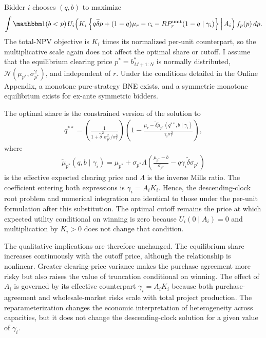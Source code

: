 \documentclass[10pt]{article}
\newcommand{\I}{\mathbbm1}
\theoremstyle{plain}
\theoremstyle{definition}
\begin{document}
Bidder $i$ chooses $(q,b)$ to maximize
\begin{align}
\label{eq:dcobjective-total}
\int
\I(b<p)\,
U_i\!\left(
K_i\left\{q\widetilde{\delta}p+(1-q)\mu_r-c_i
-RP_r^{\mathrm{unit}}(1-q\mid\gamma_i)\right\}
\,\middle|\,A_i
\right)f_p(p)\,dp.
\end{align}
The total-NPV objective is $K_i$ times its normalized per-unit counterpart, so
the multiplicative scale again does not affect the optimal share or cutoff.
I assume that the equilibrium clearing price
$p^\ast=b_{M+1:N}^\ast$ is normally distributed,
$\mathcal{N}(\mu_{p^\ast},\sigma_{p^\ast}^2)$, and independent of $r$. Under
the conditions detailed in the Online Appendix, a monotone pure-strategy BNE
exists, and a symmetric monotone equilibrium exists for ex-ante symmetric
bidders.

The optimal share is the constrained version of the solution to
\begin{align}
\label{eq:focqdc}
q^{\ast\ast}
=\left(
\frac{1}{1+\widetilde{\delta}^2\sigma_{p^\ast}^2/\sigma_r^2}
\right)
\left(
1-
\frac{\mu_r-
\widetilde{\delta}\widetilde{\mu}_{p^\ast}
(q^{\ast\ast},b\mid\gamma_i)}
{\gamma_i\sigma_r^2}
\right),
\end{align}
where
\begin{align*}
\widetilde{\mu}_{p^\ast}(q,b\mid\gamma_i)
=\mu_{p^\ast}
+\sigma_{p^\ast}\Lambda\!\left(
\frac{\mu_{p^\ast}-b}{\sigma_{p^\ast}}
-q\gamma_i\widetilde{\delta}\sigma_{p^\ast}
\right)
\end{align*}
is the effective expected clearing price and $\Lambda$ is the inverse Mills
ratio. The coefficient entering both expressions is
$\gamma_i=A_iK_i$. Hence, the descending-clock root problem and numerical
integration are identical to those under the per-unit formulation after this
substitution. The optimal cutoff remains the price at which expected utility
conditional on winning is zero because
$U_i(0\mid A_i)=0$ and multiplication by $K_i>0$ does not change that
condition.

The qualitative implications are therefore unchanged. The equilibrium share
increases continuously with the cutoff price, although the relationship is
nonlinear. Greater clearing-price variance makes the purchase agreement more
risky but also raises the value of truncation conditional on winning. The
effect of $A_i$ is governed by its effective counterpart $\gamma_i=A_iK_i$
because both purchase-agreement and wholesale-market risks scale with total
project production. The reparameterization changes the economic
interpretation of heterogeneity across capacities, but it does not change the
descending-clock solution for a given value of $\gamma_i$.



\end{document}
